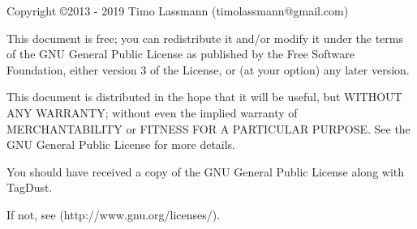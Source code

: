 \documentclass[11pt,a4paper,oneside]{book}
\begin{document}
\frontmatter
\newlength{\centeroffset}
\thispagestyle{empty}
\noindent\hspace*{\centeroffset}

\noindent\hspace*{\centeroffset}



\pagebreak
\begin{small} 

Copyright \copyright  2013 - 2019 Timo Lassmann (timolassmann@gmail.com)
 
 This document is free;  you can redistribute it and/or modify
 it under the terms of the GNU General Public License as published by
 the Free Software Foundation, either version 3 of the License, or
 (at your option) any later version.
 
 This document is distributed in the hope that it will be useful,
 but WITHOUT ANY WARRANTY; without even the implied warranty of
 MERCHANTABILITY or FITNESS FOR A PARTICULAR PURPOSE.  See the
 GNU General Public License for more details.
 
 You should have received a copy of the GNU General Public License
 along with TagDust.  
 
 If not, see (http://www.gnu.org/licenses/).



\end{small}
\end{document}
